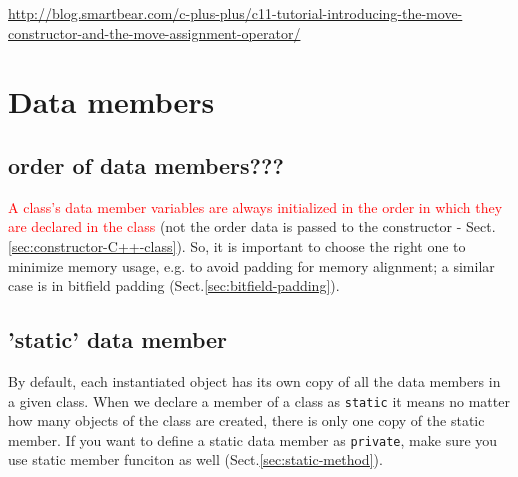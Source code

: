 \url{http://blog.smartbear.com/c-plus-plus/c11-tutorial-introducing-the-move-constructor-and-the-move-assignment-operator/}

\section{Data members}
\label{sec:data-member-C++-class}

\subsection{order of data members???}	

\textcolor{red}{A class's data member variables are always initialized in the
order in which they are declared in the class} (not the order data is passed to
the constructor - Sect.\ref{sec:constructor-C++-class}).
So, it is important to choose the right one to minimize memory usage, e.g. to
avoid padding for memory alignment; a similar case is in bitfield padding
(Sect.\ref{sec:bitfield-padding}).



% 
% 
% 
% 
%       
% 
% 
% 

\subsection{'static' data member}
\label{sec:OO_static-member}
\label{sec:static-data-member}

By default, each instantiated object has its own copy of all the data members
in a given class. 
When we declare a member of a class as \verb!static! it means no matter how many
objects of the class are created, there is only one copy of the static member.
If you want to define a static data member as \verb!private!, make sure you use
static member funciton as well (Sect.\ref{sec:static-method}).

